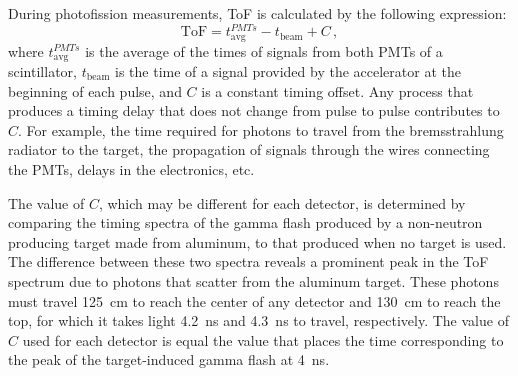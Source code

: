 \documentclass[%
 reprint,
 amsmath,amssymb,
 aps,
 nofootinbib
]{revtex4-1}
\begin{document}
During photofission measurements, ToF is calculated by the following expression:
\begin{displaymath}
\text{ToF} = t^{PMTs}_{\text{avg}} - t_{\text{beam}} + C \, ,
\end{displaymath}
where $t^{PMTs}_{\text{avg}}$ is the average of the times of signals from both PMTs of a scintillator, $t_{\text{beam}}$ is the time of a signal provided by the accelerator at the beginning of each pulse, and $C$ is a constant timing offset.
Any process that produces a timing delay that does not change from pulse to pulse contributes to $C$.
For example, the time required for photons to travel from the bremsstrahlung radiator to the target, the propagation of signals through the wires connecting the PMTs, delays in the electronics, etc.

The value of $C$, which may be different for each detector, is determined by comparing the timing spectra of the gamma flash produced by a non-neutron producing target made from aluminum, to that produced when no target is used.
The difference between these two spectra reveals a prominent peak in the ToF spectrum due to photons that scatter from the aluminum target.
These photons must travel 125~cm to reach the center of any detector and 130~cm to reach the top, for which it takes light 4.2~ns and 4.3~ns to travel, respectively.
The value of $C$ used for each detector is equal the value that places the time corresponding to the peak of the target-induced gamma flash at 4~ns.
\end{document}
